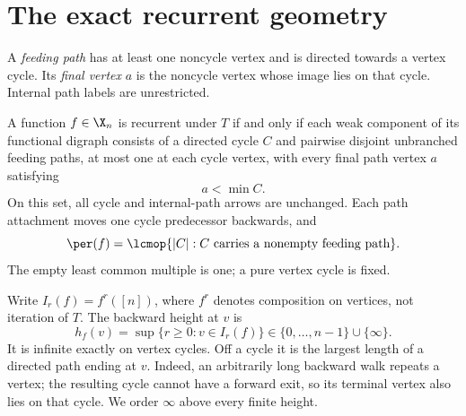 \section{The exact recurrent geometry}\label{sec:recurrence}

A \emph{feeding path} has at least one noncycle vertex and is directed
towards a vertex cycle. Its \emph{final vertex} $a$ is the noncycle vertex
whose image lies on that cycle. Internal path labels are unrestricted.

\begin{theorem}\label{thm:recurrent}
A function $f\in\X_n$ is recurrent under $T$ if and only if each weak
component of its functional digraph consists of a directed cycle $C$ and
pairwise disjoint unbranched feeding paths, at most one at each cycle
vertex, with every final path vertex $a$ satisfying
\begin{equation}\label{eq:label-bound}
 a<\min C.
\end{equation}
On this set, all cycle and internal-path arrows are unchanged. Each path
attachment moves one cycle predecessor backwards, and
\begin{equation}\label{eq:period}
 \per(f)=\lcmop\{|C|:C\text{ carries a nonempty feeding path}\}.
\end{equation}
The empty least common multiple is one; a pure vertex cycle is fixed.
\end{theorem}

Write $I_r(f)=f^r([n])$, where $f^r$ denotes composition on vertices,
not iteration of $T$. The backward height at $v$ is
\begin{equation}\label{eq:height}
 h_f(v)=\sup\{r\ge0:v\in I_r(f)\}
 \in\{0,\ldots,n-1\}\cup\{\infty\}.
\end{equation}
It is infinite exactly on vertex cycles. Off a cycle it is the largest
length of a directed path ending at $v$. Indeed, an arbitrarily long
backward walk repeats a vertex; the resulting cycle cannot have a forward
exit, so its terminal vertex also lies on that cycle. We order $\infty$
above every finite height.

